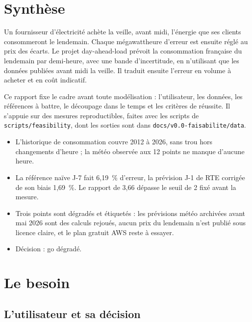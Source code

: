 \documentclass[11pt,a4paper]{article}
\begin{document}

\setcounter{tocdepth}{1}
\tableofcontents
\newpage

\section*{Synthèse}

Un fournisseur d'électricité achète la veille, avant midi, l'énergie que ses clients consommeront le lendemain. Chaque mégawattheure d'erreur est ensuite réglé au prix des écarts. Le projet day-ahead-load prévoit la consommation française du lendemain par demi-heure, avec une bande d'incertitude, en n'utilisant que les données publiées avant midi la veille. Il traduit ensuite l'erreur en volume à acheter et en coût indicatif.

Ce rapport fixe le cadre avant toute modélisation : l'utilisateur, les données, les références à battre, le découpage dans le temps et les critères de réussite. Il s'appuie sur des mesures reproductibles, faites avec les scripts de \nolinkurl{scripts/feasibility}, dont les sorties sont dans \nolinkurl{docs/v0.0-faisabilite/data}.

\begin{itemize}
  \item L'historique de consommation couvre 2012 à 2026, sans trou hors changements d'heure ; la météo observée aux 12 points ne manque d'aucune heure.
  \item La référence naïve J-7 fait 6,19~\% d'erreur, la prévision J-1 de RTE corrigée de son biais 1,69~\%. Le rapport de 3,66 dépasse le seuil de 2 fixé avant la mesure.
  \item Trois points sont dégradés et étiquetés : les prévisions météo archivées avant mai 2026 sont des calculs rejoués, aucun prix du lendemain n'est publié sous licence claire, et le plan gratuit AWS reste à essayer.
  \item Décision : go dégradé.
\end{itemize}

\section{Le besoin}

\subsection{L'utilisateur et sa décision}
\end{document}
